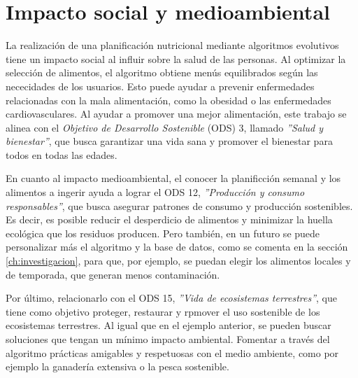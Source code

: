\chapter{Impacto social y medioambiental}
\label{ch:impacto-social-medioambiental}

La realización de una planificación nutricional mediante algoritmos evolutivos tiene un impacto social al influir sobre la salud de las personas. Al optimizar la selección de alimentos, el algoritmo obtiene menús equilibrados según las nececidades de los usuarios. Esto puede ayudar a prevenir enfermedades relacionadas con la mala alimentación, como la obesidad o las enfermedades cardiovasculares. Al ayudar a promover una mejor alimentación, este trabajo se alinea con el \textit{Objetivo de Desarrollo Sostenible} (ODS) 3, llamado \textit{''Salud y bienestar''}, que busca garantizar una vida sana y promover el bienestar para todos en todas las edades.

En cuanto al impacto medioambiental, el conocer la planificción semanal y los alimentos a ingerir ayuda a lograr el ODS 12, \textit{''Producción y consumo responsables''}, que busca asegurar patrones de consumo y producción sostenibles. Es decir, es posible reducir el desperdicio de alimentos y minimizar la huella ecológica que los residuos producen. Pero también, en un futuro se puede personalizar más el algoritmo y la base de datos, como se comenta en la sección \ref{ch:investigacion}, para que, por ejemplo, se puedan elegir los alimentos locales y de temporada, que generan menos contaminación.

Por último, relacionarlo con el ODS 15, \textit{''Vida de ecosistemas terrestres''}, que tiene como objetivo proteger, restaurar y rpmover el uso sostenible de los ecosistemas terrestres. Al igual que en el ejemplo anterior, se pueden buscar soluciones que tengan un mínimo impacto ambiental. Fomentar a través del algoritmo prácticas amigables y respetuosas con el medio ambiente, como por ejemplo la ganadería extensiva o la pesca sostenible.
